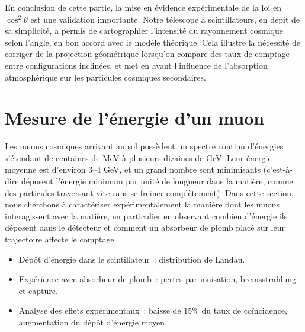 \documentclass[a4paper,12pt,twoside]{article}
\begin{document}
En conclusion de cette partie, la mise en évidence expérimentale de la loi en $\cos^2\theta$ est une validation importante. Notre télescope à scintillateurs, en dépit de sa simplicité, a permis de cartographier l’intensité du rayonnement cosmique selon l’angle, en bon accord avec le modèle théorique. Cela illustre la nécessité de corriger de la projection géométrique lorsqu’on compare des taux de comptage entre configurations inclinées, et met en avant l’influence de l’absorption atmosphérique sur les particules cosmiques secondaires.

\section{Mesure de l’énergie d’un muon}
Les muons cosmiques arrivant au sol possèdent un spectre continu d’énergies s’étendant de centaines de MeV à plusieurs dizaines de GeV. Leur énergie moyenne est d’environ 3–4 GeV, et un grand nombre sont minimisants (c’est-à-dire déposent l’énergie minimum par unité de longueur dans la matière, comme des particules traversant vite sans se freiner complètement). Dans cette section, nous cherchons à caractériser expérimentalement la manière dont les muons interagissent avec la matière, en particulier en observant combien d’énergie ils déposent dans le détecteur et comment un absorbeur de plomb placé sur leur trajectoire affecte le comptage.

\begin{itemize}
  \item Dépôt d’énergie dans le scintillateur : distribution de Landau.
  \item Expérience avec absorbeur de plomb : pertes par ionisation, bremsstrahlung et capture.
  \item Analyse des effets expérimentaux : baisse de 15\% du taux de coïncidence, augmentation du dépôt d’énergie moyen.
\end{itemize}
\end{document}
